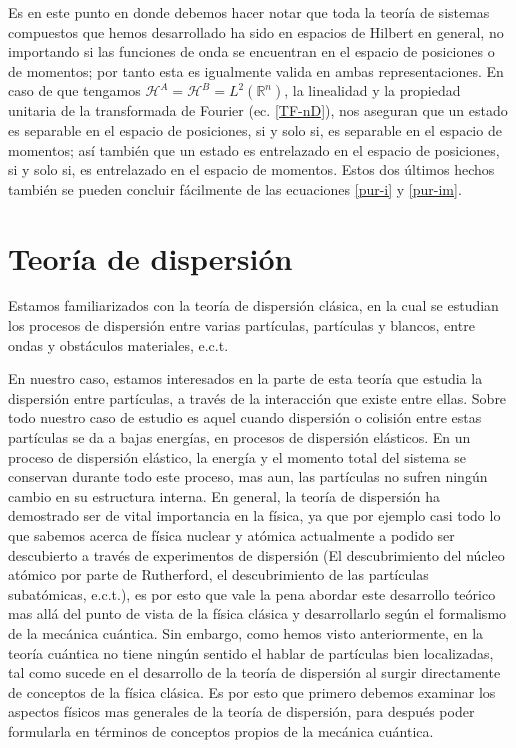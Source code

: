 \documentclass[12pt]{book}
\numberwithin{equation}{chapter}
\def\R{\mathbb{R}}
\def\H{\mathcal{H}}
\begin{document}
Es en este punto en donde debemos hacer notar que toda la teor\'ia de sistemas compuestos que hemos desarrollado ha sido en espacios de Hilbert en general, no importando si las funciones de onda se encuentran en el espacio de posiciones o de momentos; por tanto esta es igualmente valida en ambas representaciones. En caso de que tengamos $\H^{A}= \H^{B}= L^{2}(\R^{n})$, la linealidad y la propiedad unitaria de la transformada de Fourier (ec. \eqref{TF-nD}), nos aseguran que un estado es separable en el espacio de posiciones, si y solo si, es separable en el espacio de momentos; as\'i tambi\'en que un estado es entrelazado en el espacio de posiciones, si y solo si, es entrelazado en el espacio de momentos. Estos dos \'ultimos hechos tambi\'en se pueden concluir f\'acilmente de las ecuaciones \eqref{pur-i} y \eqref{pur-im}.\\
\newpage

\chapter{Teor\'ia de dispersi\'on}
Estamos familiarizados con la teor\'ia de dispersi\'on cl\'asica, en la cual se estudian los procesos de dispersi\'on entre varias part\'iculas, part\'iculas y blancos,  entre ondas y obst\'aculos materiales, e.c.t. 

En nuestro caso, estamos interesados en la parte de esta teor\'ia que estudia la dispersi\'on entre part\'iculas, a trav\'es de la interacci\'on que existe entre ellas. Sobre todo nuestro caso de estudio es aquel cuando dispersi\'on o colisi\'on entre estas part\'iculas se da a bajas energ\'ias, en procesos de dispersi\'on el\'asticos. En un proceso de dispersi\'on el\'astico, la energ\'ia y el momento total del sistema se conservan durante todo este proceso, mas aun, las part\'iculas no sufren ning\'un cambio en su estructura interna. En general, la teor\'ia de dispersi\'on ha demostrado ser de vital importancia en la f\'isica, ya que por ejemplo casi todo lo que sabemos acerca de f\'isica nuclear y at\'omica actualmente a podido ser descubierto a trav\'es de experimentos de dispersi\'on (El descubrimiento del n\'ucleo at\'omico por parte de Rutherford, el descubrimiento de las part\'iculas subat\'omicas, e.c.t.), es por esto que vale la pena abordar este desarrollo te\'orico mas all\'a del punto de vista de la f\'isica cl\'asica y desarrollarlo seg\'un el formalismo de la mec\'anica cu\'antica. Sin embargo, como hemos visto anteriormente, en la teor\'ia cu\'antica no tiene ning\'un sentido el hablar de part\'iculas bien localizadas, tal como sucede en el desarrollo de la teor\'ia de dispersi\'on al surgir directamente de conceptos de la f\'isica cl\'asica. Es por esto que primero debemos examinar los aspectos f\'isicos mas generales de la teor\'ia de dispersi\'on, para despu\'es poder formularla en t\'erminos de conceptos propios de la mec\'anica cu\'antica.
\end{document}
